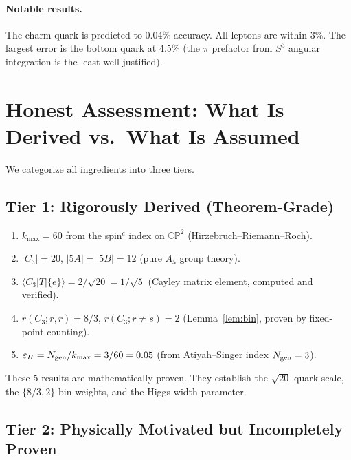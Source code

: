 \documentclass[11pt,a4paper]{article}
\newcommand{\CP}{\mathbb{CP}}
\theoremstyle{definition}
\theoremstyle{remark}
\begin{document}
\paragraph{Notable results.}
The charm quark is predicted to 0.04\% accuracy.
All leptons are within 3\%.
The largest error is the bottom quark at 4.5\% (the $\pi$ prefactor from $S^3$
angular integration is the least well-justified).

\section{Honest Assessment: What Is Derived vs.\ What Is Assumed}
\label{sec:honest}

We categorize all ingredients into three tiers.

\subsection{Tier 1: Rigorously Derived (Theorem-Grade)}

\begin{enumerate}
\item $k_{\max} = 60$ from the spin$^c$ index on $\CP^2$ (Hirzebruch--Riemann--Roch).
\item $|C_3| = 20$, $|5A| = |5B| = 12$ (pure $A_5$ group theory).
\item $\langle C_3|T|\{e\}\rangle = 2/\sqrt{20} = 1/\sqrt{5}$ (Cayley matrix element, computed and verified).
\item $r(C_3; r, r) = 8/3$, $r(C_3; r \neq s) = 2$ (Lemma~\ref{lem:bin}, proven by fixed-point counting).
\item $\varepsilon_H = N_{\rm gen}/k_{\max} = 3/60 = 0.05$ (from Atiyah--Singer index $N_{\rm gen} = 3$).
\end{enumerate}

These 5 results are mathematically proven.  They establish the $\sqrt{20}$ quark
scale, the $\{8/3, 2\}$ bin weights, and the Higgs width parameter.

\subsection{Tier 2: Physically Motivated but Incompletely Proven}
\end{document}
